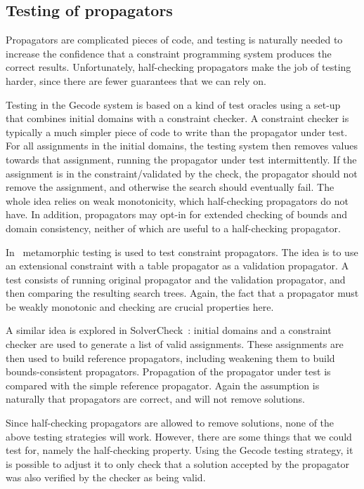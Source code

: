 \documentclass[runningheads]{llncs}
\begin{document}
\subsection{Testing of propagators}
\label{sec:testing}

Propagators are complicated pieces of code, and testing is naturally
needed to increase the confidence that a constraint programming
system produces the correct results.  Unfortunately, half-checking
propagators make the job of testing harder, since there are fewer
guarantees that we can rely on.

Testing in the Gecode system is based on a kind of test oracles using
a set-up that combines initial domains with a constraint checker. A
constraint checker is typically a much simpler piece of code to write
than the propagator under test. For all assignments in the initial
domains, the testing system then removes values towards that
assignment, running the propagator under test intermittently. If the
assignment is in the constraint/validated by the check, the propagator
should not remove the assignment, and otherwise the search should
eventually fail. The whole idea relies on weak monotonicity, which
half-checking propagators do not have. In addition, propagators may
opt-in for extended checking of bounds and domain consistency, neither
of which are useful to a half-checking propagator.

In~\cite{ozgur18} metamorphic testing is used to test constraint
propagators. The idea is to use an extensional constraint with a table
propagator as a
validation propagator. A test consists of running original propagator
and the validation propagator, and then comparing the resulting search
trees. Again, the fact that a propagator must be weakly monotonic and
checking are crucial properties here. 

A similar idea
is explored in
SolverCheck~\cite{solvercheck}: initial domains and a constraint
checker are used to generate a list of valid assignments. These
assignments are then used to build reference propagators, including
weakening them to build bounds-consistent propagators. Propagation of
the propagator under test is compared with the simple
reference propagator. Again the assumption is naturally that
propagators are correct, and will not remove solutions.

Since half-checking propagators are allowed to remove solutions, none
of the above testing strategies will work.  However, there are some
things that we could test for, namely the half-checking
property. Using the Gecode testing strategy, it is possible to adjust
it to only check that a solution accepted by the propagator was also
verified by the checker as being valid.
\end{document}
